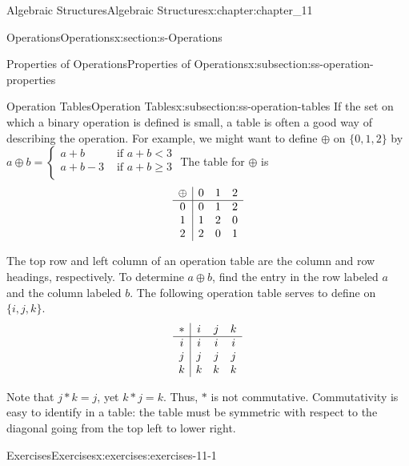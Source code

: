 \documentclass[oneside,10pt,]{book}
\numberwithin{equation}{section}
\begin{document}
\begin{chapterptx}{Algebraic Structures}{}{Algebraic Structures}{}{}{x:chapter:chapter_11}
\begin{sectionptx}{Operations}{}{Operations}{}{}{x:section:s-Operations}
\begin{subsectionptx}{Properties of Operations}{}{Properties of Operations}{}{}{x:subsection:ss-operation-properties}
\end{subsectionptx}
%
%
\typeout{************************************************}
\typeout{************************************************}
%
\begin{subsectionptx}{Operation Tables}{}{Operation Tables}{}{}{x:subsection:ss-operation-tables}
%
If the set on which a binary operation is defined is small, a table is often a good way of describing the operation. For example, we might want to define \(\oplus\) on \(\{0, 1, 2\}\) by \(a\oplus b=\left\{
\begin{array}{cc}
a+b & \textrm{ if } a+b < 3 \\
a+b-3 & \textrm{ if } a+b\geq 3 \\
\end{array}
\right.\) The table for \(\oplus\) is%
\begin{equation*}
\begin{array}{c | c c c}
\oplus & 0 & 1 & 2 \\ \hline
0 & 0 & 1 & 2 \\
1 &  1 & 2 & 0 \\
2 & 2 & 0 & 1
\end{array}
\end{equation*}
%
\par
The top row and left column of an operation table are the column and row headings, respectively. To determine \(a\oplus b\), find the entry in the row labeled \(a\) and the column labeled \(b\). The following operation table serves to define \textasteriskcentered{} on \(\{i, j, k\}\).%
\begin{equation*}
\begin{array}{c | c c c}
* & i & j & k \\ \hline
i & i & i & i \\
j &  j & j & j \\
k & k & k & k
\end{array}
\end{equation*}
%
\par
Note that \(j*k = j\), yet \(k * j = k\). Thus, \(*\) is not commutative. Commutativity is easy to identify in a table: the table must be symmetric with respect to the diagonal going from the top left to lower right.%
\end{subsectionptx}
%
%
\typeout{************************************************}
\typeout{************************************************}
%
\begin{exercises-subsection}{Exercises}{}{Exercises}{}{}{x:exercises:exercises-11-1}

\end{exercises-subsection}
\end{sectionptx}
\end{chapterptx}
\end{document}
